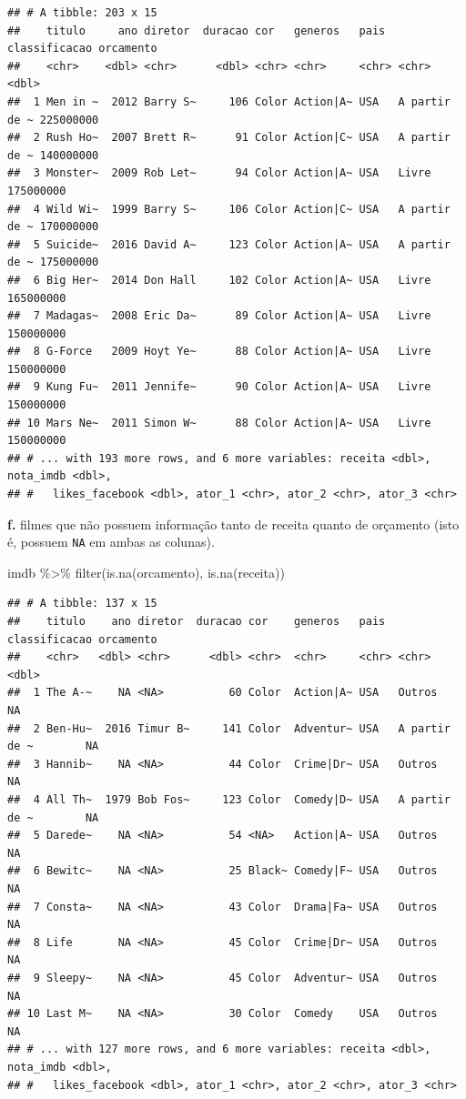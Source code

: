 \documentclass[
]{book}
\newenvironment{Shaded}{\begin{snugshade}}{\end{snugshade}}
\newcommand{\FunctionTok}[1]{\textcolor[rgb]{0.00,0.00,0.00}{#1}}
\newcommand{\NormalTok}[1]{#1}
\newcommand{\SpecialCharTok}[1]{\textcolor[rgb]{0.00,0.00,0.00}{#1}}
\begin{document}
\begin{verbatim}
## # A tibble: 203 x 15
##    titulo     ano diretor  duracao cor   generos   pais  classificacao orcamento
##    <chr>    <dbl> <chr>      <dbl> <chr> <chr>     <chr> <chr>             <dbl>
##  1 Men in ~  2012 Barry S~     106 Color Action|A~ USA   A partir de ~ 225000000
##  2 Rush Ho~  2007 Brett R~      91 Color Action|C~ USA   A partir de ~ 140000000
##  3 Monster~  2009 Rob Let~      94 Color Action|A~ USA   Livre         175000000
##  4 Wild Wi~  1999 Barry S~     106 Color Action|C~ USA   A partir de ~ 170000000
##  5 Suicide~  2016 David A~     123 Color Action|A~ USA   A partir de ~ 175000000
##  6 Big Her~  2014 Don Hall     102 Color Action|A~ USA   Livre         165000000
##  7 Madagas~  2008 Eric Da~      89 Color Action|A~ USA   Livre         150000000
##  8 G-Force   2009 Hoyt Ye~      88 Color Action|A~ USA   Livre         150000000
##  9 Kung Fu~  2011 Jennife~      90 Color Action|A~ USA   Livre         150000000
## 10 Mars Ne~  2011 Simon W~      88 Color Action|A~ USA   Livre         150000000
## # ... with 193 more rows, and 6 more variables: receita <dbl>, nota_imdb <dbl>,
## #   likes_facebook <dbl>, ator_1 <chr>, ator_2 <chr>, ator_3 <chr>
\end{verbatim}

\textbf{f.} filmes que não possuem informação tanto de receita quanto de orçamento (isto é, possuem \texttt{NA} em ambas as colunas).

\begin{Shaded}
\begin{Highlighting}[]
\NormalTok{imdb }\SpecialCharTok{\%\textgreater{}\%} 
  \FunctionTok{filter}\NormalTok{(}\FunctionTok{is.na}\NormalTok{(orcamento), }\FunctionTok{is.na}\NormalTok{(receita))}
\end{Highlighting}
\end{Shaded}

\begin{verbatim}
## # A tibble: 137 x 15
##    titulo    ano diretor  duracao cor    generos   pais  classificacao orcamento
##    <chr>   <dbl> <chr>      <dbl> <chr>  <chr>     <chr> <chr>             <dbl>
##  1 The A-~    NA <NA>          60 Color  Action|A~ USA   Outros               NA
##  2 Ben-Hu~  2016 Timur B~     141 Color  Adventur~ USA   A partir de ~        NA
##  3 Hannib~    NA <NA>          44 Color  Crime|Dr~ USA   Outros               NA
##  4 All Th~  1979 Bob Fos~     123 Color  Comedy|D~ USA   A partir de ~        NA
##  5 Darede~    NA <NA>          54 <NA>   Action|A~ USA   Outros               NA
##  6 Bewitc~    NA <NA>          25 Black~ Comedy|F~ USA   Outros               NA
##  7 Consta~    NA <NA>          43 Color  Drama|Fa~ USA   Outros               NA
##  8 Life       NA <NA>          45 Color  Crime|Dr~ USA   Outros               NA
##  9 Sleepy~    NA <NA>          45 Color  Adventur~ USA   Outros               NA
## 10 Last M~    NA <NA>          30 Color  Comedy    USA   Outros               NA
## # ... with 127 more rows, and 6 more variables: receita <dbl>, nota_imdb <dbl>,
## #   likes_facebook <dbl>, ator_1 <chr>, ator_2 <chr>, ator_3 <chr>
\end{verbatim}
\end{document}
